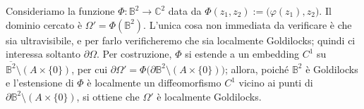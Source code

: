 Consideriamo la funzione $\Phi:\mathbb{B}^2\longrightarrow\mathbb{C}^2$ data da $\Phi(z_1,z_2):=\big(\varphi(z_1),z_2\big)$. Il dominio cercato è $\Omega'=\Phi(\mathbb{B}^2)$. L'unica cosa non immediata da verificare è che sia ultravisibile, e per farlo verificheremo che sia localmente Goldilocks; quindi ci interessa soltanto $\partial\Omega$. Per costruzione, $\Phi$ si estende a un embedding $C^1$ su $\overline{\mathbb{B}^2}\setminus(A\times\{0\})$, per cui $\partial\Omega'=\Phi\big(\partial\mathbb{B}^2\setminus(A\times\{0\})\big)$; allora, poiché $\mathbb{B}^2$ è Goldilocks e l'estensione di $\Phi$ è localmente un diffeomorfismo $C^1$ vicino ai punti di $\partial\mathbb{B}^2\setminus(A\times\{0\})$, si ottiene che $\Omega'$ è localmente Goldilocks.